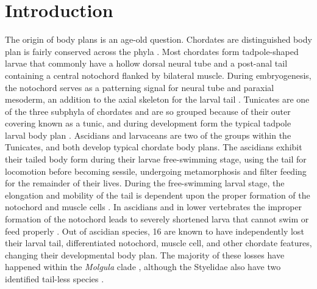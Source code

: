 \chapter{Introduction}
The origin of body plans is an age-old question. Chordates are distinguished body plan is fairly conserved across the phyla \cite{nishida_cell_2014}. Most chordates form tadpole-shaped larvae that commonly have a hollow dorsal neural tube and a post-anal tail containing a central notochord flanked by bilateral muscle. During embryogenesis, the notochord serves as a patterning signal for neural tube and paraxial mesoderm, an addition to the axial skeleton for the larval tail \cite{jeffery_evolution_1999,stemple_structure_2005}. Tunicates are one of the three subphyla of chordates and are so grouped because of their outer covering known as a tunic, and during development form the typical tadpole larval body plan \cite{huber_evolution_2000}. Ascidians and larvaceans are two of the groups within the Tunicates, and both develop typical chordate body plans. The ascidians exhibit their tailed body form during their larvae free-swimming stage, using the tail for locomotion  before becoming sessile, undergoing metamorphosis and filter feeding for the remainder of their lives. During the free-swimming larval stage, the elongation and mobility of the tail is dependent upon the proper formation of the notochord and muscle cells \cite{satoh_ascidian_2003}. In ascidians and in lower vertebrates the improper formation of the notochord leads to severely shortened larva that cannot swim or feed properly \cite{di_gregorio_tail_2002,jiang_ascidian_2005,stemple_structure_2005}. Out of   ascidian species, 16 are known to have independently lost their larval tail, differentiated notochord, muscle cell, and other chordate features, changing their developmental body plan. The majority of these losses have happened within the \textit{Molgula} clade \cite{berrill_studies_1931,swalla_interspecific_1990}, although the Styelidae also have two identified tail-less species \cite{huber_evolution_2000}.

